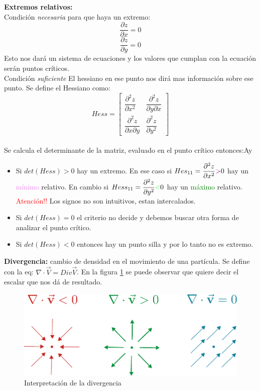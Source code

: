 \documentclass[12pt,a4paper]{article}
\begin{document}
\textbf{Extremos relativos:}\\
Condición \textit{necesaria} para que haya un extremo:
$$\dfrac{\partial z}{\partial x}=0$$
$$\dfrac{\partial z}{\partial y}= 0$$
Esto nos dará un sistema de ecuaciones y los valores que cumplan con la ecuación serán puntos críticos.\\
Condición \textit{suficiente} El hessiano en ese punto nos dirá mas información sobre ese punto. Se define el Hessiano como:\\
$$
Hess =
\begin{bmatrix}
\dfrac{\partial ^2 z}{\partial x^2 } &  \dfrac{\partial ^2 z}{\partial y \partial x} \\
\dfrac{\partial ^2 z}{\partial x \partial y} & \dfrac{\partial ^2 z}{\partial y^2}
\end{bmatrix}
$$
\\
Se calcula el determinante de la matriz, evaluado en el punto crítico entonces:Ay 
\begin{itemize}
\item Si $det(Hess) > 0$ hay un extremo.  En ese caso si $Hes_{11} = \dfrac{\partial ^2 z}{\partial x^2} \textcolor{violet}{>} 0$ hay un \textcolor{violet}{mínimo} relativo.  En cambio si $Hess_{11} =  \dfrac{\partial ^2 z}{\partial y^2} \textcolor{green}{<} 0$ hay un \textcolor{green}{máximo} relativo. \textcolor{red}{Atención!!} Los signos no son intuitivos, estan intercalados.

\item Si $det(Hess) = 0$ el criterio no decide y debemos buscar otra forma de analizar el punto crítico.

\item Si $det(Hess) < 0$ entonces hay un punto silla y por lo tanto no es extremo.
\end{itemize}


\textbf{Divergencia:} cambio de densidad en el movimiento de una partícula. Se define con la eq:
 $ \nabla  \cdot \vec{V} = Div \vec{V}$. En la figura \ref{fig:divergencia} se puede observar que quiere decir el escalar que nos dá de resultado.\\

 \begin{figure}[htbp]
   \begin{center}
       \includegraphics[scale=0.8]{divergencia.pdf}
     \caption{Interpretación de la divergencia}
     \label{fig:divergencia}
   \end{center}
 \end{figure}
\end{document}
